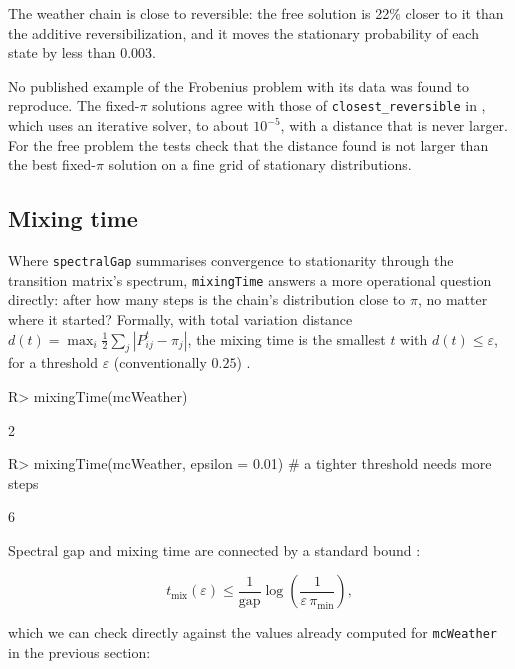 \documentclass[
  nojss]{jss}
\begin{document}
The weather chain is close to reversible: the free solution is 22\% closer
to it than the additive reversibilization, and it moves the stationary
probability of each state by less than 0.003.

No published example of the Frobenius problem with its data was found to
reproduce. The fixed-\(\pi\) solutions agree with those of
\texttt{closest\_reversible} in , which uses an iterative solver, to
about \(10^{-5}\), with a distance that is never larger. For the free problem
the tests check that the distance found is not larger than the best fixed-\(\pi\)
solution on a fine grid of stationary distributions.

\subsection{Mixing time}\label{mixing-time}

Where \texttt{spectralGap} summarises convergence to stationarity through the
transition matrix's spectrum, \texttt{mixingTime} answers a more operational
question directly: after how many steps is the chain's distribution close
to \(\pi\), no matter where it started? Formally, with total variation
distance \(d(t) = \max_i \tfrac12\sum_j |P^t_{ij}-\pi_j|\), the mixing time is
the smallest \(t\) with \(d(t)\le\varepsilon\), for a threshold \(\varepsilon\)
(conventionally \(0.25\)) \citep{levinPeres2017}.

\begin{CodeChunk}
\begin{CodeInput}
R> mixingTime(mcWeather)
\end{CodeInput}
\begin{CodeOutput}
[1] 2
\end{CodeOutput}
\begin{CodeInput}
R> mixingTime(mcWeather, epsilon = 0.01) # a tighter threshold needs more steps
\end{CodeInput}
\begin{CodeOutput}
[1] 6
\end{CodeOutput}
\end{CodeChunk}

Spectral gap and mixing time are connected by a standard bound
\citep[Theorem 12.3]{levinPeres2017}:

\[
t_{\mathrm{mix}}(\varepsilon) \le \frac{1}{\mathrm{gap}}
  \log\!\left(\frac{1}{\varepsilon\,\pi_{\min}}\right),
\]

which we can check directly against the values already computed for
\texttt{mcWeather} in the previous section:
\end{document}
